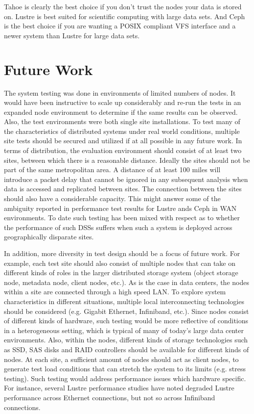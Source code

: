 \documentclass[11pt]{article}
\begin{document}
Tahoe is clearly the best choice if you don't trust the nodes your
data is stored on. Lustre is best suited for scientific computing with
large data sets. And Ceph is the best choice if you are wanting a
POSIX compliant VFS interface and a newer system than Lustre for large
data sets.

\section{Future Work}

The system testing was done in environments of limited numbers of 
nodes. It would have been instructive to scale up considerably and 
re-run the tests in an expanded node environment to determine if 
the same results can be observed. Also, the test environments were 
both single site installations. To test many of the characteristics 
of distributed systems under real world conditions, multiple site 
tests should be secured and utilized if at all possible in any future 
work. In terms of distribution, the evaluation environment should 
consist of at least two sites, between which there is a reasonable 
distance. Ideally the sites should not be part of the same 
metropolitan area. A distance of at least 100 miles will introduce 
a packet delay that cannot be ignored in any subsequent analysis when
data is accessed and replicated between sites. The connection between 
the sites should also have a considerable capacity. This might answer 
some of the ambiguity reported in performance test results for Lustre 
ands Ceph in WAN environments. To date such testing has been mixed with 
respect as to whether the performance of such DSSs suffers when such a 
system is deployed across geographically disparate sites. 

In addition, more diversity in test design should be a focus of future 
work. For example, each test site should also consist of multiple nodes 
that can take on different kinds of roles in the larger distributed 
storage system (object storage node, metadata node, client nodes, etc.). 
As is the case in data centers, the nodes within a site are connected 
through a high speed LAN. To explore system characteristics in different 
situations, multiple local interconnecting technologies should be 
considered (e.g. Gigabit Ethernet, Infiniband, etc.). Since nodes 
consist of different kinds of hardware, such testing would be more 
reflective of conditions in a heterogeneous setting, which is typical 
of many of today’s large data center environments. Also, within the 
nodes, different kinds of storage technologies such as SSD, SAS disks 
and RAID controllers should be available for different kinds of nodes. 
At each site, a sufficient amount of nodes should act as client nodes, 
to generate test load conditions that can stretch the system to its 
limits (e.g. stress testing). Such testing would address performance 
issues which hardware specific. For instance, several Lustre performance 
studies have noted degraded Lustre performance across Ethernet connections,
but not so across Infiniband connections.
\end{document}
